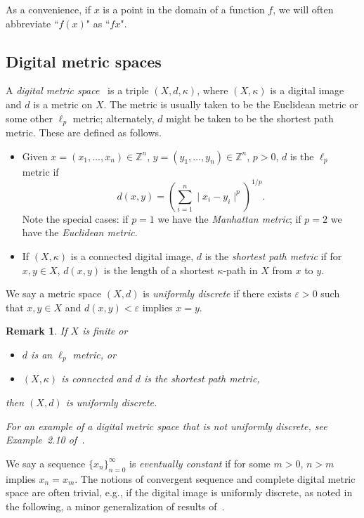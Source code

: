 \documentclass{article}
\newtheorem{remarks}[thm]{Remark}
\numberwithin{thm}{section}
\def\Z{{\mathbb Z}}
\begin{document}
As a convenience, if $x$ is a point in the
domain of a function $f$, we will often
abbreviate ``$f(x)$" as ``$fx$".

\subsection{Digital metric spaces}
\label{DigMetSp}
A {\em digital metric space}~\cite{EgeKaraca15} is a triple
$(X,d,\kappa)$, where $(X,\kappa)$ is a digital image and $d$ is a metric on $X$. The
metric is usually taken to be the Euclidean
metric or some other $\ell_p$ metric; 
alternately, $d$ might be taken to be the
shortest path metric. These are defined
as follows.
\begin{itemize}
    \item Given 
          $x = (x_1, \ldots, x_n) \in \Z^n$,
          $y = (y_1, \ldots, y_n) \in \Z^n$,
          $p > 0$, $d$ is the $\ell_p$ metric
          if \[ d(x,y) =
          \left ( \sum_{i=1}^n
          \mid x_i - y_i \mid ^ p
          \right ) ^ {1/p}. \]
          Note the special cases: if $p=1$ we
          have the {\em Manhattan metric}; if
          $p=2$ we have the 
          {\em Euclidean metric}.
    \item \cite{ChartTian} If $(X,\kappa)$ is a 
          connected digital image, 
          $d$ is the {\em shortest path metric}
          if for $x,y \in X$, $d(x,y)$ is the 
          length of a shortest
          $\kappa$-path in $X$ from $x$ to $y$.
\end{itemize}

We say a metric space $(X,d)$ is {\em uniformly discrete}
if there exists $\varepsilon > 0$ such that
$x,y \in X$ and $d(x,y) < \varepsilon$ implies $x=y$.

\begin{remarks}
\label{unifDiscrete}
If $X$ is finite or  
\begin{itemize}
\item {\rm \cite{Bx19-3}}
$d$ is an $\ell_p$ metric, or
\item $(X,\kappa)$ is connected and $d$ is 
the shortest path metric,
\end{itemize}
then $(X,d)$ is uniformly discrete.

For an example of a digital metric space
that is not uniformly discrete, see
Example~2.10 of~{\rm \cite{Bx20}}.
\end{remarks}

We say a sequence $\{x_n\}_{n=0}^{\infty}$ is 
{\em eventually constant} if for some $m>0$, 
$n>m$ implies $x_n=x_m$.
The notions of convergent sequence and complete digital metric space are often trivial, 
e.g., if the digital image is uniformly 
discrete, as noted in the following, a minor 
generalization of results 
of~\cite{HanBanach,BxSt19}.
\end{document}
